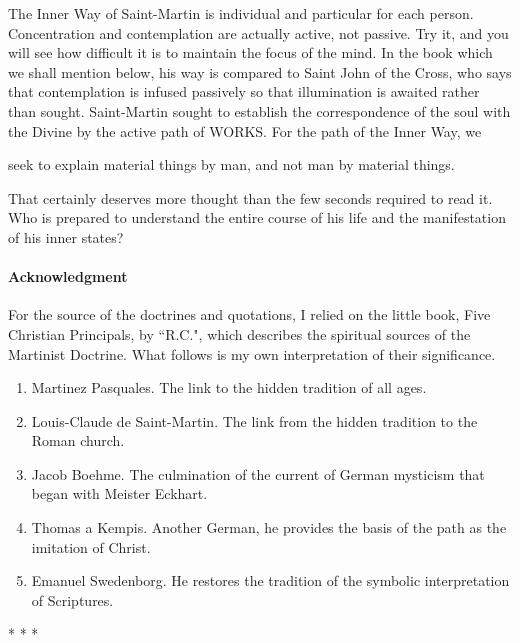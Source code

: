 The Inner Way of Saint-Martin is individual and particular for each person. Concentration and contemplation are actually active, not passive. Try it, and you will see how difficult it is to maintain the focus of the mind. In the book which we shall mention below, his way is compared to Saint John of the Cross, who says that contemplation is infused passively so that illumination is awaited rather than sought. Saint-Martin sought to establish the correspondence of the soul with the Divine by the active path of WORKS. For the path of the Inner Way, we

\begin{quotex}
seek to explain material things by man, and not man by material things. 

\end{quotex}
That certainly deserves more thought than the few seconds required to read it. Who is prepared to understand the entire course of his life and the manifestation of his inner states?


\hfill

\paragraph{Acknowledgment}
For the source of the doctrines and quotations, I relied on the little book, Five Christian Principals, by ``R.C.", which describes the spiritual sources of the Martinist Doctrine. What follows is my own interpretation of their significance.

\begin{enumerate}
\item Martinez Pasquales. The link to the hidden tradition of all ages. 
\item Louis-Claude de Saint-Martin. The link from the hidden tradition to the Roman church. 
\item Jacob Boehme. The culmination of the current of German mysticism that began with Meister Eckhart. 
\item Thomas a Kempis. Another German, he provides the basis of the path as the imitation of Christ. 
\item Emanuel Swedenborg. He restores the tradition of the symbolic interpretation of Scriptures. 
\end{enumerate}



\begin{center}* * *\end{center}


